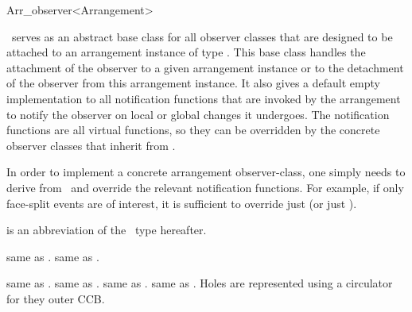 
\ccRefPageBegin

\begin{ccRefClass}{Arr_observer<Arrangement>}
\label{arr_ref:arr_obs}

\ccDefinition

\ccClassTemplateName\ serves as an abstract base class for all observer
classes that are designed to be attached to an arrangement instance of
type . This base class handles the attachment of the
observer to a given arrangement instance or to the detachment of the
observer from this arrangement instance. It also gives a default empty
implementation to all notification functions that are invoked by the
arrangement to notify the observer on local or global changes it undergoes.
The notification functions are all virtual functions, so they can be
overridden by the concrete observer classes that inherit from
\ccClassTemplateName.

In order to implement a concrete arrangement observer-class, one simply
needs to derive from \ccClassTemplateName\ and override the relevant
notification functions. For example, if only face-split events are of
interest, it is sufficient to override just  
(or just ).

 is an abbreviation of the \ccRefName\ type hereafter.


\ccTypes


  {same as .}
\ccGlue
{}
  {same as .}

  {same as .}
\ccGlue
{}
  {same as .}
\ccGlue
{}
  {same as .}
\ccGlue
{}
  {same as .
   Holes are represented using a circulator for they outer CCB.}


\end{ccRefClass}
